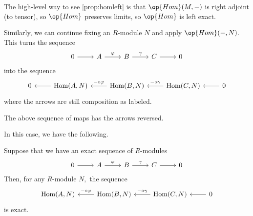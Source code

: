 \begin{remark}
	The high-level way to see \autoref{prop:homleft} is that $\op{Hom}(M,-)$ is right adjoint (to tensor), so $\op{Hom}$ preserves limits, so $\op{Hom}$ is left exact.
\end{remark}
Similarly, we can continue fixing an $R$-module $N$ and apply $\op{Hom}(-,N).$ This turns the sequence
\[\begin{tikzcd}
	0 & A & B & C & 0
	\arrow[from=1-1, to=1-2]
	\arrow["\varphi", from=1-2, to=1-3]
	\arrow["\gamma", from=1-3, to=1-4]
	\arrow[from=1-4, to=1-5]
\end{tikzcd}\]
into the sequence
\[\begin{tikzcd}
	0 & {\operatorname{Hom}(A,N)} & {\operatorname{Hom}(B,N)} & {\operatorname{Hom}(C,N)} & 0
	\arrow[from=1-2, to=1-1]
	\arrow["{-\circ\varphi}"', from=1-3, to=1-2]
	\arrow["{-\circ\gamma}"', from=1-4, to=1-3]
	\arrow[from=1-5, to=1-4]
\end{tikzcd}\]
where the arrows are still composition as labeled.
\begin{warn}
	The above sequence of maps has the arrows reversed.
\end{warn}
In this case, we have the following.
\begin{proposition}
	Suppose that we have an exact sequence of $R$-modules
	\[\begin{tikzcd}
		0 & A & B & C & 0
		\arrow[from=1-1, to=1-2]
		\arrow["\varphi", from=1-2, to=1-3]
		\arrow["\gamma", from=1-3, to=1-4]
		\arrow[from=1-4, to=1-5]
	\end{tikzcd}\]
	Then, for any $R$-module $N,$ the sequence
	\[\begin{tikzcd}
		{\operatorname{Hom}(A,N)} & {\operatorname{Hom}(B,N)} & {\operatorname{Hom}(C,N)} & 0
		\arrow["{-\circ\varphi}"', from=1-2, to=1-1]
		\arrow["{-\circ\gamma}"', from=1-3, to=1-2]
		\arrow[from=1-4, to=1-3]
	\end{tikzcd}\]
	is exact.
\end{proposition}

